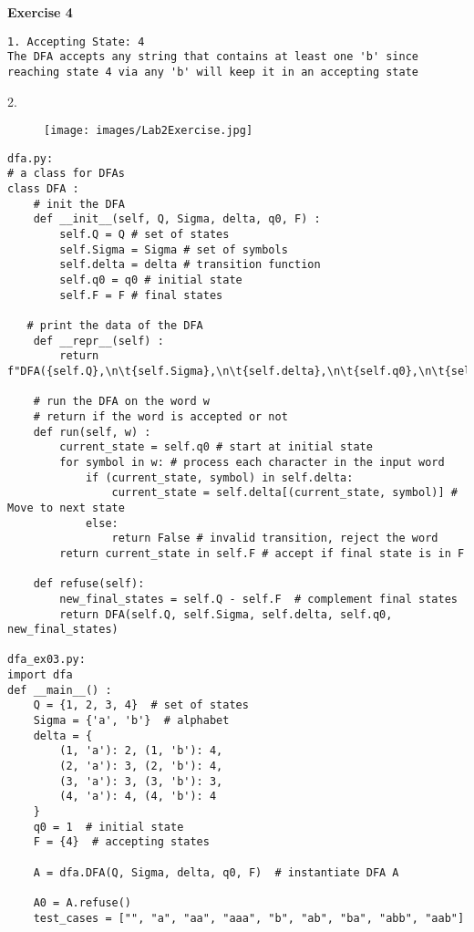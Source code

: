 \documentclass{article}
\theoremstyle{theorem}
\theoremstyle{definition}
\theoremstyle{remark}
\begin{document}
\textbf{Exercise 4} 
\begin{lstlisting}
1. Accepting State: 4
The DFA accepts any string that contains at least one 'b' since reaching state 4 via any 'b' will keep it in an accepting state
\end{lstlisting}

2. \begin{figure}[h] %
    \centering
    \texttt{[image: images/Lab2Exercise.jpg]} %
    \caption{}
\end{figure}

\begin{lstlisting}
dfa.py:
# a class for DFAs
class DFA :
    # init the DFA
    def __init__(self, Q, Sigma, delta, q0, F) : 
        self.Q = Q # set of states
        self.Sigma = Sigma # set of symbols
        self.delta = delta # transition function
        self.q0 = q0 # initial state
        self.F = F # final states
   
   # print the data of the DFA
    def __repr__(self) :
        return f"DFA({self.Q},\n\t{self.Sigma},\n\t{self.delta},\n\t{self.q0},\n\t{self.F})"

    # run the DFA on the word w
    # return if the word is accepted or not
    def run(self, w) :
        current_state = self.q0 # start at initial state
        for symbol in w: # process each character in the input word
            if (current_state, symbol) in self.delta:
                current_state = self.delta[(current_state, symbol)] # Move to next state
            else:
                return False # invalid transition, reject the word
        return current_state in self.F # accept if final state is in F       

    def refuse(self):
        new_final_states = self.Q - self.F  # complement final states
        return DFA(self.Q, self.Sigma, self.delta, self.q0, new_final_states)

dfa_ex03.py:
import dfa
def __main__() :
    Q = {1, 2, 3, 4}  # set of states
    Sigma = {'a', 'b'}  # alphabet
    delta = {
        (1, 'a'): 2, (1, 'b'): 4,
        (2, 'a'): 3, (2, 'b'): 4,
        (3, 'a'): 3, (3, 'b'): 3,
        (4, 'a'): 4, (4, 'b'): 4
    }
    q0 = 1  # initial state
    F = {4}  # accepting states

    A = dfa.DFA(Q, Sigma, delta, q0, F)  # instantiate DFA A
    
    A0 = A.refuse()
    test_cases = ["", "a", "aa", "aaa", "b", "ab", "ba", "abb", "aab"]
    

\end{lstlisting}
\end{document}
